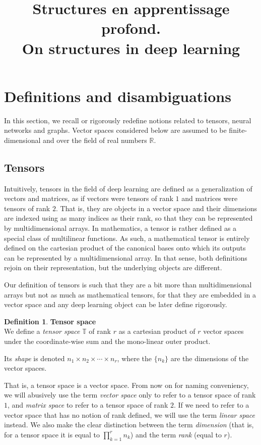 \documentclass{article}
\title{Structures en apprentissage profond.\\ On structures in deep learning}
\theoremstyle{definition}
\newtheorem{definition}{Definition}[section]
\theoremstyle{remark}
\theoremstyle{plain}
\newcommand{\real}{\mathbb{R}}
\newcommand{\tspace}{\mathbb{T}}
\begin{document}
\section{Definitions and disambiguations}

In this section, we recall or rigorously redefine notions related to tensors, neural networks and graphs. Vector spaces considered below are assumed to be finite-dimensional and over the field of real numbers $\real$.

\subsection{Tensors}

Intuitively, tensors in the field of deep learning are defined as a generalization of vectors and matrices, as if vectors were tensors of rank $1$ and matrices were tensors of rank $2$. That is, they are objects in a vector space and their dimensions are indexed using as many indices as their rank, so that they can be represented by multidimensional arrays. In mathematics, a tensor is rather defined as a special class of multilinear functions. As such, a mathematical tensor is entirely defined on the cartesian product of the canonical bases onto which its outputs can be represented by a multidimensional array. In that sense, both definitions rejoin on their representation, but the underlying objects are different.

Our definition of tensors is such that they are a bit more than multidimensional arrays but not as much as mathematical tensors, for that they are embedded in a vector space and any deep learning object can be later define rigorously.

\begin{definition}\textbf{Tensor space}\\
We define a \emph{tensor space} $\tspace$ of rank $r$ as a cartesian product of $r$ vector spaces under the coordinate-wise sum and the mono-linear outer product.

Its \emph{shape} is denoted $n_1 \times n_2 \times \cdots \times n_r$, where the $\{n_k\}$ are the dimensions of the vector spaces.
\end{definition}

That is, a tensor space is a vector space. From now on for naming conveniency, we will abusively use the term \emph{vector space} only to refer to a tensor space of rank $1$, and \emph{matrix space} to refer to a tensor space of rank $2$. If we need to refer to a vector space that has no notion of rank defined, we will use the term \emph{linear space} instead.
We also make the clear distinction between the term \emph{dimension} (that is, for a tensor space it is equal to $\displaystyle \prod_{k=1}^r n_k$) and the term \emph{rank} (equal to $r$).
\end{document}
